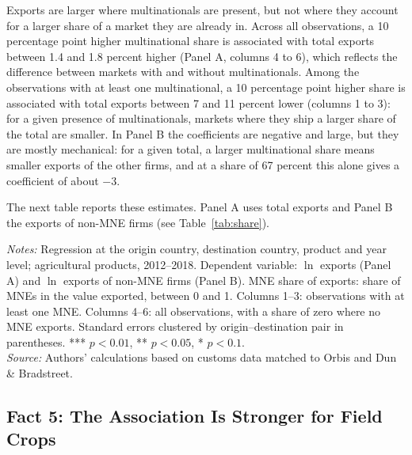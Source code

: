 \documentclass[11pt,a4paper]{article}
\newcommand{\srcnote}{\textit{Source:} Authors' calculations based on customs data matched to Orbis and Dun \& Bradstreet.}
\begin{document}
Exports are larger where multinationals are present, but not where they account for a larger share
of a market they are already in. Across all observations, a 10 percentage point higher multinational
share is associated with total exports between 1.4 and 1.8 percent higher (Panel A, columns 4 to 6),
which reflects the difference between markets with and without multinationals. Among the
observations with at least one multinational, a 10 percentage point higher share is associated with
total exports between 7 and 11 percent lower (columns 1 to 3): for a given presence of
multinationals, markets where they ship a larger share of the total are smaller. In Panel B the
coefficients are negative and large, but they are mostly mechanical: for a given total, a larger
multinational share means smaller exports of the other firms, and at a share of 67 percent this
alone gives a coefficient of about $-3$.

The next table reports these estimates. Panel A uses total exports and Panel B the exports of
non-MNE firms (see Table~\ref{tab:share}).
\begin{table}[H]\centering\small%
  \caption{Multinational Share and Agricultural Exports}%
  \label{tab:share}%
  \par\vspace{3pt}%
  \begin{minipage}{0.95\textwidth}\footnotesize %
  \textit{Notes:} Regression at the origin country, destination country, product and year level; agricultural products, 2012--2018. Dependent variable: $\ln$ exports (Panel A) and $\ln$ exports of non-MNE firms (Panel B). MNE share of exports: share of MNEs in the value exported, between 0 and 1. Columns 1--3: observations with at least one MNE. Columns 4--6: all observations, with a share of zero where no MNE exports. Standard errors clustered by origin--destination pair in parentheses. *** $p<0.01$, ** $p<0.05$, * $p<0.1$.\\[3pt]%
  \srcnote%
  \end{minipage}%
  \end{table}

\subsection{Fact 5: The Association Is Stronger for Field Crops}
\end{document}
